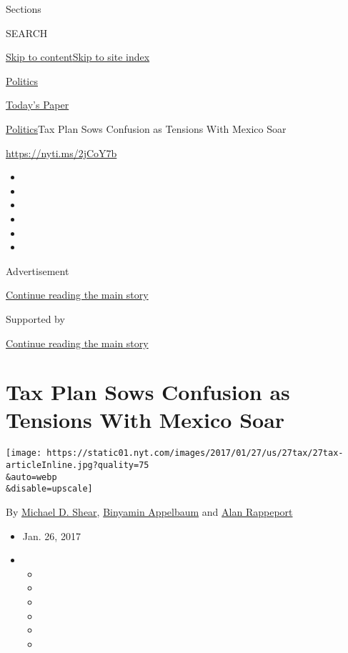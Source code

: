 Sections

SEARCH

\protect\hyperlink{site-content}{Skip to
content}\protect\hyperlink{site-index}{Skip to site index}

\href{https://www.nytimes.com/section/politics}{Politics}

\href{https://myaccount.nytimes.com/auth/login?response_type=cookie\&client_id=vi}{}

\href{https://www.nytimes.com/section/todayspaper}{Today's Paper}

\href{/section/politics}{Politics}\textbar{}Tax Plan Sows Confusion as
Tensions With Mexico Soar

\url{https://nyti.ms/2jCoY7b}

\begin{itemize}
\item
\item
\item
\item
\item
\item
\end{itemize}

Advertisement

\protect\hyperlink{after-top}{Continue reading the main story}

Supported by

\protect\hyperlink{after-sponsor}{Continue reading the main story}

\hypertarget{tax-plan-sows-confusion-as-tensions-with-mexico-soar}{%
\section{Tax Plan Sows Confusion as Tensions With Mexico
Soar}\label{tax-plan-sows-confusion-as-tensions-with-mexico-soar}}

\texttt{[image: https://static01.nyt.com/images/2017/01/27/us/27tax/27tax-articleInline.jpg?quality=75\\\&auto=webp\\\&disable=upscale]}

By \href{http://www.nytimes.com/by/michael-d-shear}{Michael D. Shear},
\href{http://www.nytimes.com/by/binyamin-appelbaum}{Binyamin Appelbaum}
and \href{https://www.nytimes.com/by/alan-rappeport}{Alan Rappeport}

\begin{itemize}
\item
  Jan. 26, 2017
\item
  \begin{itemize}
  \item
  \item
  \item
  \item
  \item
  \item
  \end{itemize}
\end{itemize}

